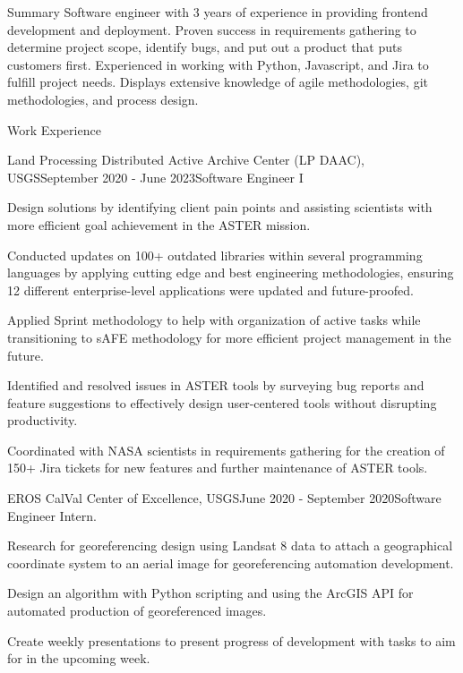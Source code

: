 \documentclass[11pt, a4paper]{resume}
\begin{document}
\begin{rSection}{Summary}
{\normalfont Software engineer with 3 years of experience in providing frontend development and deployment. Proven success in requirements gathering to determine project scope, identify bugs, and put out a product that puts customers first. Experienced in working with Python, Javascript, and Jira to fulfill project needs. Displays extensive knowledge of agile methodologies, git methodologies, and process design.}
\end{rSection}


\begin{rSection}{Work Experience}
\begin{rSubsection}{Land Processing Distributed Active Archive Center (LP DAAC), USGS}{\normalfont September 2020 - June 2023}{Software Engineer I}{}
 \item {\normalfont Design solutions by identifying client pain points and assisting scientists with more efficient goal achievement in the ASTER mission.}
  \item {\normalfont Conducted updates on 100+ outdated libraries within several programming languages by applying cutting edge and best engineering methodologies, ensuring 12 different enterprise-level applications were updated and future-proofed.}
 \item {\normalfont Applied Sprint methodology to help with organization of active tasks while transitioning to sAFE methodology for more efficient project management in the future.}
 \item {\normalfont Identified and resolved issues in ASTER tools by surveying bug reports and feature suggestions to effectively design user-centered tools without disrupting productivity.}
 \item {\normalfont Coordinated with NASA scientists in requirements gathering for the creation of 150+ Jira tickets for new features and further maintenance of ASTER tools.}
\end{rSubsection}
\begin{rSubsection}{EROS CalVal Center of Excellence, USGS}{\normalfont June 2020 - September 2020}{Software Engineer Intern.}{}
 \item {\normalfont Research for georeferencing design using Landsat 8 data to attach a geographical coordinate system to an aerial image for georeferencing automation development.}
 \item {\normalfont Design an algorithm with Python scripting and using the ArcGIS API for automated production of georeferenced images.}
  \item {\normalfont Create weekly presentations to present progress of development with tasks to aim for in the upcoming week.}
\end{rSubsection}

\end{rSection}
\end{document}
